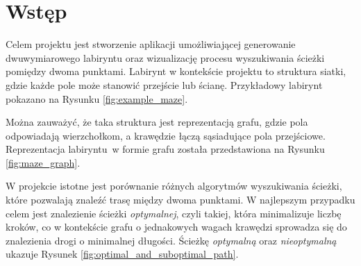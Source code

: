 \section{Wstęp}

Celem projektu jest stworzenie aplikacji umożliwiającej generowanie dwuwymiarowego labiryntu oraz wizualizację procesu wyszukiwania ścieżki pomiędzy dwoma punktami.
Labirynt w kontekście projektu to struktura siatki, gdzie każde pole może stanowić przejście lub ścianę. Przykładowy labirynt pokazano na Rysunku \ref{fig:example_maze}.



Można zauważyć, że taka struktura jest reprezentacją grafu, gdzie pola odpowiadają wierzchołkom, a krawędzie łączą sąsiadujące pola przejściowe. Reprezentacja labiryntu~w formie grafu została przedstawiona na Rysunku \ref{fig:maze_graph}.



W projekcie istotne jest porównanie różnych algorytmów wyszukiwania ścieżki, które pozwalają znaleźć trasę między dwoma punktami. W najlepszym przypadku celem jest znalezienie ścieżki \textit{optymalnej}, czyli takiej, która minimalizuje liczbę kroków, co w kontekście grafu o jednakowych wagach krawędzi sprowadza się do znalezienia drogi o minimalnej długości. Ścieżkę \textit{optymalną} oraz \textit{nieoptymalną} ukazuje Rysunek \ref{fig:optimal_and_suboptimal_path}. 

\newpage

